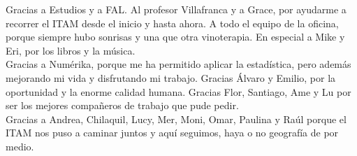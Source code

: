 Gracias a Estudios y a FAL. Al profesor Villafranca y a Grace, por ayudarme a recorrer el ITAM desde el inicio y hasta ahora. A todo el equipo de la oficina, porque siempre hubo sonrisas y una que otra vinoterapia. En especial a Mike y Eri, por los libros y la música.\\

Gracias a Numérika, porque me ha permitido aplicar la estadística, pero además mejorando mi vida y disfrutando mi trabajo. Gracias Álvaro y Emilio, por la oportunidad y la enorme calidad humana. Gracias Flor, Santiago, Ame y Lu por ser los mejores compañeros de trabajo que pude pedir.\\

Gracias a Andrea, Chilaquil, Lucy, Mer, Moni, Omar, Paulina y Raúl porque el ITAM nos puso a caminar juntos y aquí seguimos, haya o no geografía de por medio.

